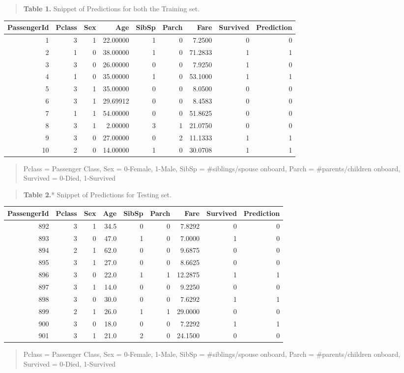 \documentclass[]{article}
\begin{document}
\begin{quote}
\textbf{Table 1.} Snippet of Predictions for both the Training set.
\end{quote}

\begin{longtable}[]{@{}rrrrrrrrr@{}}
\toprule
PassengerId & Pclass & Sex & Age & SibSp & Parch & Fare & Survived &
Prediction\tabularnewline
\midrule
\endhead
1 & 3 & 1 & 22.00000 & 1 & 0 & 7.2500 & 0 & 0\tabularnewline
2 & 1 & 0 & 38.00000 & 1 & 0 & 71.2833 & 1 & 1\tabularnewline
3 & 3 & 0 & 26.00000 & 0 & 0 & 7.9250 & 1 & 0\tabularnewline
4 & 1 & 0 & 35.00000 & 1 & 0 & 53.1000 & 1 & 1\tabularnewline
5 & 3 & 1 & 35.00000 & 0 & 0 & 8.0500 & 0 & 0\tabularnewline
6 & 3 & 1 & 29.69912 & 0 & 0 & 8.4583 & 0 & 0\tabularnewline
7 & 1 & 1 & 54.00000 & 0 & 0 & 51.8625 & 0 & 0\tabularnewline
8 & 3 & 1 & 2.00000 & 3 & 1 & 21.0750 & 0 & 0\tabularnewline
9 & 3 & 0 & 27.00000 & 0 & 2 & 11.1333 & 1 & 1\tabularnewline
10 & 2 & 0 & 14.00000 & 1 & 0 & 30.0708 & 1 & 1\tabularnewline
\bottomrule
\end{longtable}

\begin{quote}
Pclass = Passenger Class, Sex = 0-Female, 1-Male, SibSp =
\#siblings/spouse onboard, Parch = \#parents/children onboard, Survived
= 0-Died, 1-Survived
\end{quote}

\begin{quote}
\textbf{Table 2.}* Snippet of Predictions for Testing set.
\end{quote}

\begin{longtable}[]{@{}rrrrrrrrr@{}}
\toprule
PassengerId & Pclass & Sex & Age & SibSp & Parch & Fare & Survived &
Prediction\tabularnewline
\midrule
\endhead
892 & 3 & 1 & 34.5 & 0 & 0 & 7.8292 & 0 & 0\tabularnewline
893 & 3 & 0 & 47.0 & 1 & 0 & 7.0000 & 1 & 0\tabularnewline
894 & 2 & 1 & 62.0 & 0 & 0 & 9.6875 & 0 & 0\tabularnewline
895 & 3 & 1 & 27.0 & 0 & 0 & 8.6625 & 0 & 0\tabularnewline
896 & 3 & 0 & 22.0 & 1 & 1 & 12.2875 & 1 & 1\tabularnewline
897 & 3 & 1 & 14.0 & 0 & 0 & 9.2250 & 0 & 0\tabularnewline
898 & 3 & 0 & 30.0 & 0 & 0 & 7.6292 & 1 & 1\tabularnewline
899 & 2 & 1 & 26.0 & 1 & 1 & 29.0000 & 0 & 0\tabularnewline
900 & 3 & 0 & 18.0 & 0 & 0 & 7.2292 & 1 & 1\tabularnewline
901 & 3 & 1 & 21.0 & 2 & 0 & 24.1500 & 0 & 0\tabularnewline
\bottomrule
\end{longtable}

\begin{quote}
Pclass = Passenger Class, Sex = 0-Female, 1-Male, SibSp =
\#siblings/spouse onboard, Parch = \#parents/children onboard, Survived
= 0-Died, 1-Survived
\end{quote}
\end{document}
